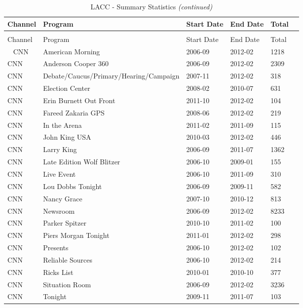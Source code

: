 \begin{longtable}{llllll}
\caption{LACC - Summary Statistics} 
\label{tab:lacc_program_summary}
\\
\toprule
Channel & Program & Start Date & End Date & Total \\ 
\midrule
\endfirsthead
\caption[]{LACC - Summary Statistics \textit{(continued)}}\\
\toprule
Channel & Program & Start Date & End Date & Total \\ 
\midrule
\endhead
\
\endfoot
\bottomrule
\endlastfoot 
CNN & American Morning & 2006-09 & 2012-02 & 1218 \\ 
  CNN & Anderson Cooper 360 & 2006-09 & 2012-02 & 2309 \\ 
  CNN & Debate/Caucus/Primary/Hearing/Campaign & 2007-11 & 2012-02 & 318 \\ 
  CNN & Election Center & 2008-02 & 2010-07 & 631 \\ 
  CNN & Erin Burnett Out Front & 2011-10 & 2012-02 & 104 \\ 
  CNN & Fareed Zakaria GPS & 2008-06 & 2012-02 & 219 \\ 
  CNN & In the Arena & 2011-02 & 2011-09 & 115 \\ 
  CNN & John King USA & 2010-03 & 2012-02 & 446 \\ 
  CNN & Larry King & 2006-09 & 2011-07 & 1362 \\ 
  CNN & Late Edition Wolf Blitzer & 2006-10 & 2009-01 & 155 \\ 
  CNN & Live Event & 2006-10 & 2011-09 & 310 \\ 
  CNN & Lou Dobbs Tonight & 2006-09 & 2009-11 & 582 \\ 
  CNN & Nancy Grace & 2007-10 & 2010-12 & 813 \\ 
  CNN & Newsroom & 2006-09 & 2012-02 & 8233 \\ 
  CNN & Parker Spitzer & 2010-10 & 2011-02 & 100 \\ 
  CNN & Piers Morgan Tonight & 2011-01 & 2012-02 & 298 \\ 
  CNN & Presents & 2006-10 & 2012-02 & 102 \\ 
  CNN & Reliable Sources & 2006-10 & 2012-02 & 214 \\ 
  CNN & Ricks List & 2010-01 & 2010-10 & 377 \\ 
  CNN & Situation Room & 2006-09 & 2012-02 & 3236 \\ 
  CNN & Tonight & 2009-11 & 2011-07 & 103 \\ 

\end{longtable}
